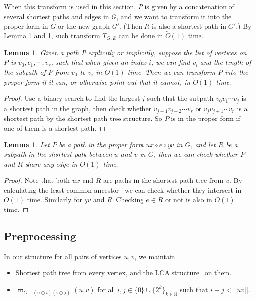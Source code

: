 \documentclass[11pt]{article}
\theoremstyle{plain}
\newtheorem{lemma}[theorem]{Lemma}
\theoremstyle{definition}
\newcommand{\too}[1]{\tilde{O}({#1})}
\newcommand{\odg}[3]{\varpi_{G-#3}\left(#1,#2\right)}
\begin{document}
When this transform is used in this section, $P$ is given by a concatenation of several shortest paths and edges in $G$, and we want to transform it into the proper form in $G$ or the new graph $G'$. (Then $R$ is also a shortest path in $G'$.) By Lemma \ref{lemma2-2} and \ref{lemma2-3}, such transform $T_{G,R}$ can be done in $\tilde{O}(1)$ time.

\begin{lemma}\label{lemma2-2}
Given a path $P$ explicitly or implicitly, suppose the list of vertices on $P$ is $v_0,v_1,\cdots, v_r$, such that when given an index $i$, we can find $v_i$ and the length of the subpath of $P$ from $v_0$ to $v_i$ in $\tilde{O}(1)$ time.
Then we can transform $P$ into the proper form if it can, or otherwise point out that it cannot, in $\too{1}$ time.
\end{lemma}

\begin{proof}


Use a binary search to find the largest $j$ such that the subpath $v_0v_1\cdots v_j$ is a shortest path in the graph, then check whether $v_{j+1}v_{j+2}\cdots v_r$ or $v_jv_{j+1}\cdots v_r$ is a shortest path by the shortest path tree structure. So $P$ is in the proper form if one of them is a shortest path.
\end{proof}

\begin{lemma}\label{lemma2-3}
Let $P$ be a path in the proper form $ux\circ e\circ yv$ in $G$, and let $R$ be a subpath in the shortest path between $u$ and $v$ in $G$, then we can check whether $P$ and $R$ share any edge in $O(1)$ time.
\end{lemma}

\begin{proof}
Note that both $ux$ and $R$ are paths in the shortest path tree from $u.$ By calculating the least common ancestor~\cite{BF00} we can check whether they intersect in $O(1)$ time. Similarly for $yv$ and $R.$ Checking $e\in R$ or not is also in $O(1)$ time. 
\end{proof}




\subsection{Preprocessing}
In our structure for all pairs of vertices $u,v$, we maintain
\begin{itemize}
    \item Shortest path tree from every vertex, and the LCA structure~\cite{BF00} on them.
\item $\odg{u}{v}{(u \oplus i)(v \ominus j)}$ for all $i, j\in\{0\}\cup\{2^k\}_{k\in\mathbb{N}}$ such that $i+j < ||uv||$.
\end{itemize}
\end{document}
